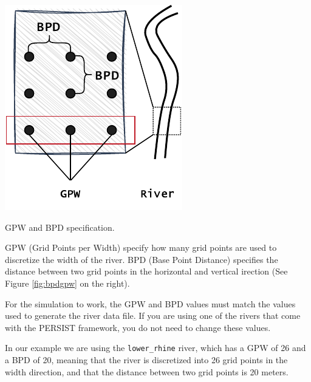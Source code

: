 \documentclass[
	a4paper, %
	12pt, %
]{persist}
\begin{document}
\begin{marginfigure}
	\includegraphics[width=\linewidth]{img/bpdgpw.pdf}
	\caption{GPW and BPD specification.}
	\label{fig:bpdgpw}
\end{marginfigure}

GPW (Grid Points per Width) specify how many grid points are used to discretize the width of the river. BPD (Base Point Distance) specifies the distance between two grid points in the horizontal and vertical irection (See Figure \ref{fig:bpdgpw} on the right). 

\begin{note}
	For the simulation to work, the GPW and BPD values must match the values used to generate the river data file. If you are using one of the rivers that come with the PERSIST framework, you do not need to change these values.
\end{note}

In our example we are using the \verb|lower_rhine| river, which has a GPW of 26 and a BPD of 20, meaning that the river is discretized into 26 grid points in the width direction, and that the distance between two grid points is 20 meters.
\end{document}
